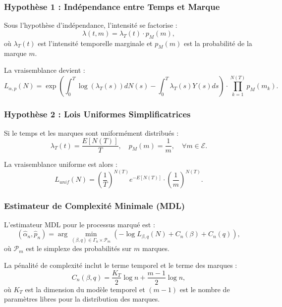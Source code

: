 \documentclass[11pt,a4paper]{article}
\begin{document}
	\subsubsection{Hypothèse 1 : Indépendance entre Temps et Marque}
	
	Sous l'hypothèse d'indépendance, l'intensité se factorise :
	\begin{equation}
		\lambda(t, m) = \lambda_T(t) \cdot p_M(m),
	\end{equation}
	où $\lambda_T(t)$ est l'intensité temporelle marginale et $p_M(m)$ est la probabilité de la marque $m$.
	
	La vraisemblance devient :
	\begin{equation}
		L_{\alpha, p}(N) = \exp \left( \int_0^T \log(\lambda_T(s)) dN(s) - \int_0^T \lambda_T(s)Y(s) ds \right) \cdot \prod_{k=1}^{N(T)} p_M(m_k).
	\end{equation}
	
	\subsubsection{Hypothèse 2 : Lois Uniformes Simplificatrices}
	
	Si le temps et les marques sont uniformément distribués :
	\begin{equation}
		\lambda_T(t) = \frac{E[N(T)]}{T}, \quad p_M(m) = \frac{1}{m}, \quad \forall m \in \mathcal{E}.
	\end{equation}
	
	La vraisemblance uniforme est alors :
	\begin{equation}
		L_{unif}(N) = \left( \frac{1}{T} \right)^{N(T)} e^{-E[N(T)]} \cdot \left( \frac{1}{m} \right)^{N(T)}.
	\end{equation}
	
	\subsubsection{Estimateur de Complexité Minimale (MDL)}
	
	L'estimateur MDL pour le processus marqué est :
	\begin{equation}
		(\hat{\alpha}_n, \hat{p}_n) = \arg \min_{(\beta, q) \in \Gamma_n \times \mathcal{P}_m} \left( -\log L_{\beta, q}(N) + C_n(\beta) + C_n(q) \right),
	\end{equation}
	où $\mathcal{P}_m$ est le simplexe des probabilités sur $m$ marques.
	
	La pénalité de complexité inclut le terme temporel et le terme des marques :
	\begin{equation}
		C_n(\beta, q) = \frac{K_T}{2} \log n + \frac{m-1}{2} \log n,
	\end{equation}
	où $K_T$ est la dimension du modèle temporel et $(m-1)$ est le nombre de paramètres libres pour la distribution des marques.
	
\end{document}

